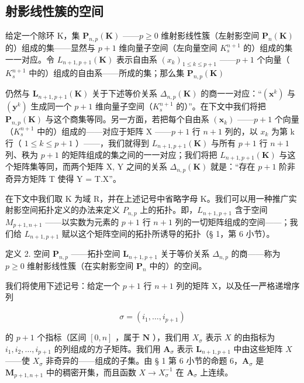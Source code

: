 \subsection{射影线性簇的空间}

给定一个除环 K，集 \(\mathbf{P}_{n,p}(\mathbf{K})\) ——\(p \geqslant 0\) 维射影线性簇（左射影空间 \(\mathbf{P}_{n}(\mathbf{K})\) 的）组成的集——显然与 \(p + 1\) 维向量子空间（左向量空间 \(K_{s}^{n+1}\) 的）组成的集一一对应。令 \(L_{n+1, p+1}(\mathbf{K})\) 表示自由系 \((x_{k})_{1 \leqslant k \leqslant p+1}\) ——\(p + 1\) 个向量（\(K_{s}^{n+1}\) 中的）组成的自由系——所成的集；那么集 \(\mathbf{P}_{n,p}(\mathbf{K})\)

仍然与 \(\mathbf{L}_{n+1,p+1}(\mathbf{K})\) 关于下述等价关系 \(\Delta_{n,p}(\mathbf{K})\) 的商一一对应：“\((\mathbf{x}^{k})\) 与 \((\mathbf{y}^{k})\) 生成同一个 \(p+1\) 维向量子空间（\(K_{s}^{n+1}\) 的）”。在下文中我们将把 \(\mathbf{P}_{n,p}(\mathbf{K})\) 与这个商集等同。另一方面，若把每个自由系 \((\mathbf{x}_{k})\) ——\(p+1\) 个向量（\(K_{s}^{n+1}\) 中的）组成的——对应于矩阵 X ——\(p+1\) 行 \(n+1\) 列的，以 \(x_{k}\) 为第 k 行（ \(1\leqslant k\leqslant p+1\) ）——，我们就得到 \(L_{n+1,p+1}(\mathbf{K})\) 与所有 \(p+1\) 行 \(n+1\) 列、秩为 \(p+1\) 的矩阵组成的集之间的一一对应；我们将把 \(L_{n+1,p+1}(\mathbf{K})\) 与这个矩阵集等同，而两个矩阵 X, Y 之间的关系 \(\Delta_{n,p}(\mathbf{K})\) 就是：“存在 \(p+1\) 阶非奇异方矩阵 T 使得 Y = T.X”。

在下文中我们取 K 为域 R，并在上述记号中省略字母 K。我们可以用一种推广实射影空间拓扑定义的办法来定义 \(P_{n,p}\) 上的拓扑。即，\(L_{n+1, p+1}\) 含于空间 \(M_{p+1, n+1}\) ——以实数为元素的 \(p + 1\) 行 \(n + 1\) 列的一切矩阵组成的空间——；我们给 \(L_{n+1, p+1}\) 赋以这个矩阵空间的拓扑所诱导的拓扑（§ 1，第 6 小节）。

定义 2. 空间 \(\mathbf{P}_{n,p}\) ——拓扑空间 \(\mathbf{L}_{n+1,p+1}\) 关于等价关系 \(\Delta_{n,p}\) 的商——称为 \(p\geqslant0\) 维射影线性簇（在实射影空间 \(\mathbf{P}_{n}\) 中的）的空间。

我们将使用下述记号：给定一个 \(p + 1\) 行 \(n + 1\) 列的矩阵 X，以及任一严格递增序列

\[
\sigma = (i _ {1}, \dots , i _ {p + 1})
\]

的 \(p + 1\) 个指标（区间 \([0, n]\) ，属于 \(\mathbf{N}\) ），我们用 \(X_{\sigma}\) 表示 \(X\) 的由指标为 \(i_1, i_2, \ldots, i_{p+1}\) 的列组成的方子矩阵。我们用 \(\mathbf{A}_{\sigma}\) 表示 \(\mathbf{L}_{n+1, p+1}\) 中由这些矩阵 \(X\) ——使 \(X_{\sigma}\) 非奇异的——组成的子集。由 § 1 第 6 小节的命题 6，\(\mathbf{A}_{\sigma}\) 是 \(\mathbf{M}_{p+1, n+1}\) 中的稠密开集，而且函数 \(X \to X_{\sigma}^{-1}\) 在 \(\mathbf{A}_{\sigma}\) 上连续。

